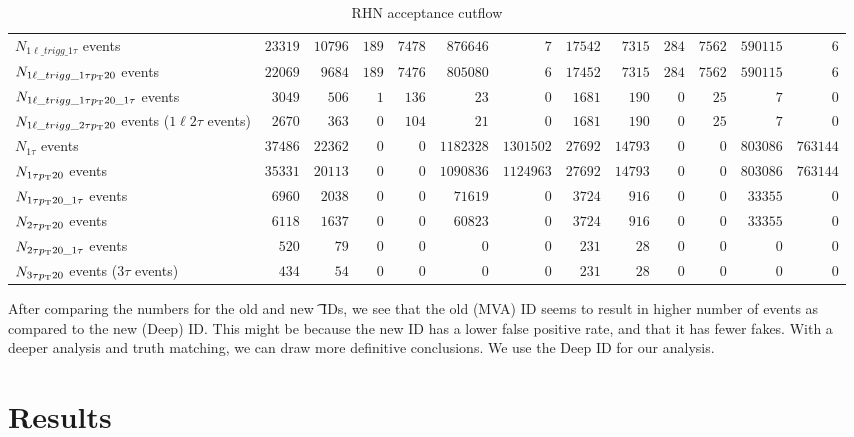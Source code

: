 \documentclass[letterpaper,12pt]{article}
\begin{document}
\begin{table}[h]
{\begin{tabular}{l|rr|rrrr|rr|rrrr}
      $N_{1\ell\_trigg\_1\tau}$ events & $23319$ & $10796$ & $189$ & $7478$ & $876646$ & $7$ & $17542$ & $7315$ & $284$ & $7562$ & $590115$ & $6$\\
      $N_{1\ell\_trigg\_1\tau p_{\mathrm{T}}20}$ events & $22069$ & $9684$ & $189$ & $7476$ & $805080$ & $6$ & $17452$ & $7315$ & $284$ & $7562$ & $590115$ & $6$\\
      $N_{1\ell\_trigg\_1\tau p_{\mathrm{T}}20\_1\tau}$ events & $3049$ & $506$ & $1$ & $136$ & $23$ & $0$ & $1681$ & $190$ & $0$ & $25$ & $7$ & $0$\\
      $N_{1\ell\_trigg\_2\tau p_{\mathrm{T}}20}$ events ($1\ell2\tau$ events) & $2670$ & $363$ & $0$ & $104$ & $21$ & $0$ & $1681$ & $190$ & $0$ & $25$ & $7$ & $0$\\
      $N_{1\tau}$ events & $37486$ & $22362$ & $0$ & $0$ & $1182328$ & $1301502$ & $27692$ & $14793$ & $0$ & $0$ & $803086$ & $763144$\\
      $N_{1\tau p_{\mathrm{T}}20}$ events & $35331$ & $20113$ & $0$ & $0$ & $1090836$ & $1124963$ & $27692$ & $14793$ & $0$ & $0$ & $803086$ & $763144$\\
      $N_{1\tau p_{\mathrm{T}}20\_1\tau}$ events & $6960$ & $2038$ & $0$ & $0$ & $71619$ & $0$ & $3724$ & $916$ & $0$ & $0$ & $33355$ & $0$\\
      $N_{2\tau p_{\mathrm{T}}20}$ events & $6118$ & $1637$ & $0$ & $0$ & $60823$ & $0$ & $3724$ & $916$ & $0$ & $0$ & $33355$ & $0$\\
      $N_{2\tau p_{\mathrm{T}}20\_1\tau}$ events & $520$ & $79$ & $0$ & $0$ & $0$ & $0$ & $231$ & $28$ & $0$ & $0$ & $0$ & $0$\\
      $N_{3\tau p_{\mathrm{T}}20}$ events ($3\tau$ events) & $434$ & $54$ & $0$ & $0$ & $0$ & $0$ & $231$ & $28$ & $0$ & $0$ & $0$ & $0$\\
      \hline
      \hline	
    \end{tabular}%
  }
  \caption{RHN acceptance cutflow}
  \label{tab:cutflow}
\end{table}

After comparing the numbers for the old and new \t{} IDs, we see that the old (MVA) ID seems to result in higher number of events as compared to the new (Deep) ID. This might be because the new ID has a lower false positive rate, and that it has fewer fakes. With a deeper analysis and truth matching, we can draw more definitive conclusions. We use the Deep ID for our analysis.
 
\section{Results}
\label{sec:results}
\end{document}
